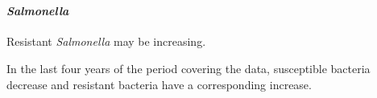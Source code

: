 \documentclass[11pt]{article}
\begin{document}
    \begin{center}
    \end{center}
    { \hspace*{\fill} \\}
    
    \hypertarget{salmonella}{%
\paragraph{\texorpdfstring{\emph{Salmonella}}{Salmonella}}\label{salmonella}}

    Resistant \emph{Salmonella} may be increasing.

In the last four years of the period covering the data, susceptible
bacteria decrease and resistant bacteria have a corresponding increase.
\end{document}
